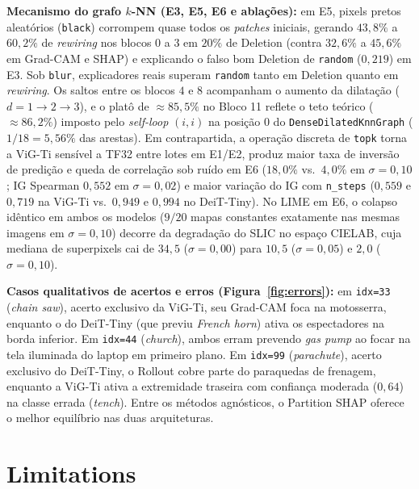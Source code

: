 \documentclass{article}
\begin{document}
\textbf{Mecanismo do grafo $k$-NN (E3, E5, E6 e ablações):} em E5, pixels pretos aleatórios (\texttt{black}) corrompem quase todos os \textit{patches} iniciais, gerando $43{,}8\%$ a $60{,}2\%$ de \textit{rewiring} nos blocos $0$ a $3$ em $20\%$ de Deletion (contra $32{,}6\%$ a $45{,}6\%$ em Grad-CAM e SHAP) e explicando o falso bom Deletion de \texttt{random} ($0{,}219$) em E3. Sob \texttt{blur}, explicadores reais superam \texttt{random} tanto em Deletion quanto em \textit{rewiring}. Os saltos entre os blocos $4$ e $8$ acompanham o aumento da dilatação ($d = 1 \rightarrow 2 \rightarrow 3$), e o platô de $\approx 85{,}5\%$ no Bloco 11 reflete o teto teórico ($\approx 86{,}2\%$) imposto pelo \textit{self-loop} $(i, i)$ na posição $0$ do \texttt{DenseDilatedKnnGraph} ($1/18 = 5{,}56\%$ das arestas). Em contrapartida, a operação discreta de \texttt{topk} torna a ViG-Ti sensível a TF32 entre lotes em E1/E2, produz maior taxa de inversão de predição e queda de correlação sob ruído em E6 ($18{,}0\%$ vs.\ $4{,}0\%$ em $\sigma = 0{,}10$; IG Spearman $0{,}552$ em $\sigma = 0{,}02$) e maior variação do IG com \texttt{n\_steps} ($0{,}559$ e $0{,}719$ na ViG-Ti vs.\ $0{,}949$ e $0{,}994$ no DeiT-Tiny). No LIME em E6, o colapso idêntico em ambos os modelos ($9/20$ mapas constantes exatamente nas mesmas imagens em $\sigma = 0{,}10$) decorre da degradação do SLIC no espaço CIELAB, cuja mediana de superpixels cai de $34{,}5$ ($\sigma = 0{,}00$) para $10{,}5$ ($\sigma = 0{,}05$) e $2{,}0$ ($\sigma = 0{,}10$).

\textbf{Casos qualitativos de acertos e erros (Figura~\ref{fig:errors}):} em \texttt{idx=33} (\textit{chain saw}), acerto exclusivo da ViG-Ti, seu Grad-CAM foca na motosserra, enquanto o do DeiT-Tiny (que previu \textit{French horn}) ativa os espectadores na borda inferior. Em \texttt{idx=44} (\textit{church}), ambos erram prevendo \textit{gas pump} ao focar na tela iluminada do laptop em primeiro plano. Em \texttt{idx=99} (\textit{parachute}), acerto exclusivo do DeiT-Tiny, o Rollout cobre parte do paraquedas de frenagem, enquanto a ViG-Ti ativa a extremidade traseira com confiança moderada ($0{,}64$) na classe errada (\textit{tench}). Entre os métodos agnósticos, o Partition SHAP oferece o melhor equilíbrio nas duas arquiteturas.

\section{Limitations}
\label{sec:limitations}
\end{document}
